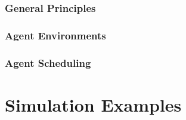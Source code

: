 \begin{bibliographysection}
\section{General Principles}
\localized
\localized
\localized
\localized

\section{Agent Environments}
\localized
\localized
\localized
\localized
\localized

\section{Agent Scheduling}
\localized

\part{Simulation Examples}

\localized
\localized
\localized
\localized
\localized
\localized
\localized
\localized

\appendix

\localized
\localized

\end{bibliographysection}


\endinput
